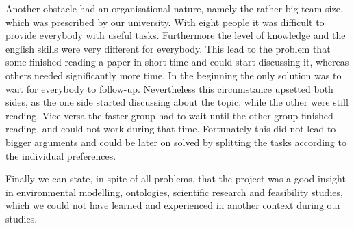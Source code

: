 \par
Another obstacle had an organisational nature, namely the rather big team size, which was prescribed by our university. With eight people it was difficult to provide everybody with useful tasks. Furthermore the level of knowledge and the english skills were very different for everybody. This lead to the problem that some finished reading a paper in short time and could start discussing it, whereas others needed significantly more time. In the beginning the only solution was to wait for everybody to follow-up. Nevertheless this circumstance upsetted both sides, as the one side started discussing about the topic, while the other were still reading. Vice versa the faster group had to wait until the other group finished reading, and could not work during that time. Fortunately this did not lead to bigger arguments and could be later on solved by splitting the tasks according to the individual preferences.
\par
Finally we can state, in spite of all problems, that the project was a good insight in environmental modelling, ontologies, scientific research and feasibility studies, which we could not have learned and experienced in another context during our studies.
















